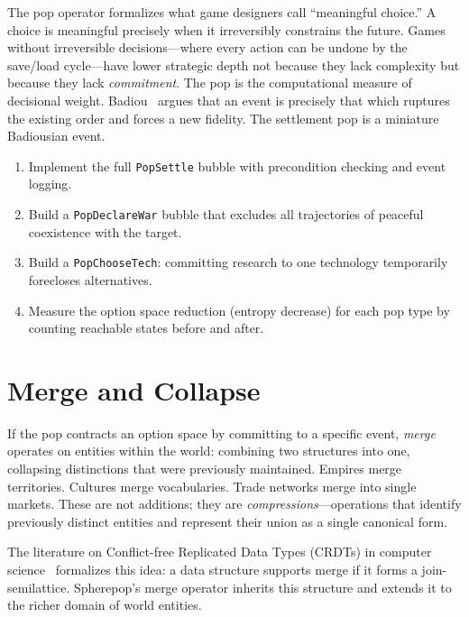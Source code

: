 \documentclass[11pt,a4paper,openany]{book}
\theoremstyle{plain}
\theoremstyle{definition}
\theoremstyle{remark}
\newenvironment{background}{%
  \begin{mdframed}[
    linecolor=sphereblue!40, backgroundcolor=sphereblue!5,
    linewidth=1pt, innertopmargin=8pt, innerbottommargin=8pt,
    innerleftmargin=10pt, innerrightmargin=10pt,
    skipabove=10pt, skipbelow=6pt
  ]%
  \setlength{\parindent}{0pt}%
  \noindent{\textcolor{sphereblue}{\textbf{Background}}}\par\smallskip\ignorespaces
}{\end{mdframed}}
\newenvironment{perspective}{%
  \begin{mdframed}[
    linecolor=spherered!40, backgroundcolor=spherered!4,
    linewidth=1pt, innertopmargin=8pt, innerbottommargin=8pt,
    innerleftmargin=10pt, innerrightmargin=10pt,
    skipabove=10pt, skipbelow=6pt
  ]%
  \setlength{\parindent}{0pt}%
  \noindent{\textcolor{spherered}{\textbf{Perspective}}}\par\smallskip\ignorespaces
}{\end{mdframed}}
\newenvironment{project}[1]{%
  \begin{tcolorbox}[
    title={\textbf{Project: #1}},
    colback=projectbg,
    colframe=sphereblue,
    fonttitle=\bfseries\color{white},
    coltitle=white,
    attach boxed title to top left={yshift=-2mm, xshift=4mm},
    boxed title style={colback=sphereblue, sharp corners},
    sharp corners,
    breakable,
    before upper={\normalfont\setlength{\parindent}{0pt}\tolerance=9999\hbadness=9999}
  ]
}{\end{tcolorbox}}
\begin{document}
\begin{perspective}
  The pop operator formalizes what game designers call ``meaningful
  choice.'' A choice is meaningful precisely when it irreversibly
  constrains the future. Games without irreversible decisions---where
  every action can be undone by the save/load cycle---have lower
  strategic depth not because they lack complexity but because they lack
  \emph{commitment}. The pop is the computational measure of decisional
  weight. Badiou~\cite{Badiou} argues that an event is precisely that
  which ruptures the existing order and forces a new fidelity. The
  settlement pop is a miniature Badiousian event.
\end{perspective}

\begin{project}{Irreversible Settlement System}
  \begin{enumerate}
    \item Implement the full \texttt{PopSettle} bubble with precondition
          checking and event logging.
    \item Build a \texttt{PopDeclareWar} bubble that excludes all
          trajectories of peaceful coexistence with the target.
    \item Build a \texttt{PopChooseTech}: committing research to one
          technology temporarily forecloses alternatives.
    \item Measure the option space reduction (entropy decrease) for each
          pop type by counting reachable states before and after.
  \end{enumerate}
\end{project}

\chapter{Merge and Collapse}
\label{ch:merge}

\begin{background}
  If the pop contracts an option space by committing to a specific event,
  \emph{merge} operates on entities within the world: combining two
  structures into one, collapsing distinctions that were previously
  maintained. Empires merge territories. Cultures merge vocabularies.
  Trade networks merge into single markets. These are not additions;
  they are \emph{compressions}---operations that identify previously
  distinct entities and represent their union as a single canonical form.

  The literature on Conflict-free Replicated Data Types (CRDTs)
  in computer science~\cite{Meijer} formalizes this idea: a data
  structure supports merge if it forms a join-semilattice. Spherepop's
  merge operator inherits this structure and extends it to the richer
  domain of world entities.
\end{background}
\end{document}
